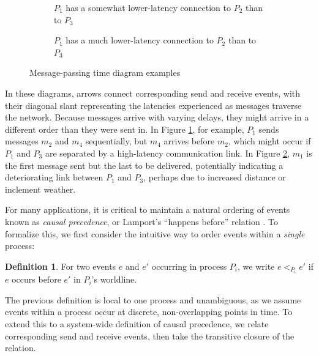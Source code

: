 \documentclass[]             %
{NASA}                       %
\theoremstyle{definition}
\newtheorem{definition}[theorem]{Definition}
\begin{document}
\begin{figure}[p]
  \setlength\belowcaptionskip{5ex}
  \begin{subfigure}{1\textwidth}
    \centering
    
    \caption{$P_1$ has a somewhat lower-latency connection to $P_2$ than to $P_3$}
    \label{fig:message-latencies-a}
  \end{subfigure}
  \begin{subfigure}{1\textwidth}
    \centering 
    \caption{$P_1$ has a much lower-latency connection to $P_2$ than to $P_3$}
    \label{fig:message-latencies-b}
  \end{subfigure}
  \caption{Message-passing time diagram examples}
  \label{fig:message-latencies}
\end{figure}

In these diagrams, arrows connect corresponding send and receive
events, with their diagonal slant representing the latencies
experienced as messages traverse the network. Because messages arrive
with varying delays, they might arrive in a different order than they
were sent in. In Figure \ref{fig:message-latencies-a}, for example,
$P_1$ sends messages $m_2$ and $m_4$ sequentially, but $m_4$ arrives
before $m_2$, which might occur if $P_1$ and $P_3$ are separated by a
high-latency communication link. In Figure
\ref{fig:message-latencies-b}, $m_1$ is the first message sent but the
last to be delivered, potentially indicating a deteriorating link
between $P_1$ and $P_3$, perhaps due to increased distance or
inclement weather.

For many applications, it is critical to maintain a natural ordering
of events known as \emph{causal precedence}, or Lamport's ``happens
before'' relation \cite{1978:lamportclocks}. To formalize this, we
first consider the intuitive way to order events within a
\emph{single} process:
\begin{definition}
  For two events $e$ and $e'$ occurring in process $P_i$, we
  write $e <_{P_i} e'$ if $e$ occurs before $e'$ in $P_i$'s
  worldline.
\end{definition}
The previous definition is local to one process and unambiguous, as we
assume events within a process occur at discrete, non-overlapping
points in time. To extend this to a system-wide definition of causal
precedence, we relate corresponding send and receive events, then take
the transitive closure of the relation.
\end{document}
